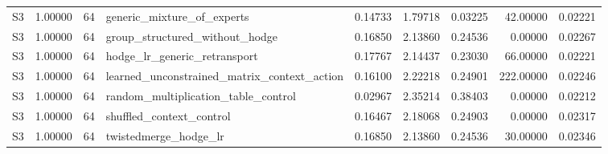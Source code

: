 \begin{tabular}{lrrlrrrrr}
S3 & 1.00000 & 64 & generic_mixture_of_experts & 0.14733 & 1.79718 & 0.03225 & 42.00000 & 0.02221 \\
S3 & 1.00000 & 64 & group_structured_without_hodge & 0.16850 & 2.13860 & 0.24536 & 0.00000 & 0.02267 \\
S3 & 1.00000 & 64 & hodge_lr_generic_retransport & 0.17767 & 2.14437 & 0.23030 & 66.00000 & 0.02221 \\
S3 & 1.00000 & 64 & learned_unconstrained_matrix_context_action & 0.16100 & 2.22218 & 0.24901 & 222.00000 & 0.02246 \\
S3 & 1.00000 & 64 & random_multiplication_table_control & 0.02967 & 2.35214 & 0.38403 & 0.00000 & 0.02212 \\
S3 & 1.00000 & 64 & shuffled_context_control & 0.16467 & 2.18068 & 0.24903 & 0.00000 & 0.02317 \\
S3 & 1.00000 & 64 & twistedmerge_hodge_lr & 0.16850 & 2.13860 & 0.24536 & 30.00000 & 0.02346 \\
\bottomrule
\end{tabular}
